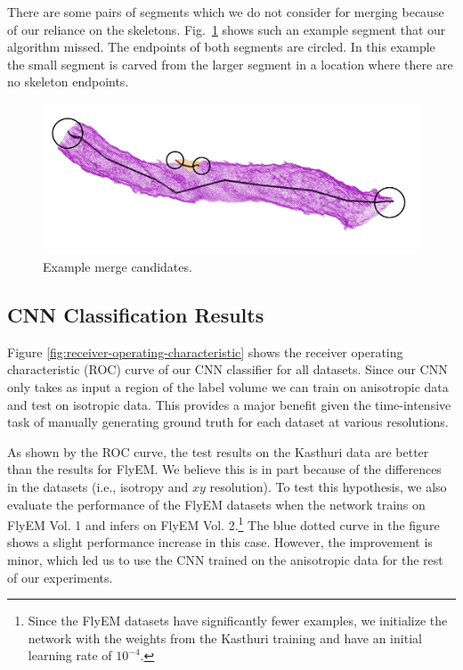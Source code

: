 There are some pairs of segments which we do not consider for merging because of our reliance on the skeletons. 
Fig.~\ref{fig:skeleton-results} shows such an example segment that our algorithm missed. 
The endpoints of both segments are circled.
In this example the small segment is carved from the larger segment in a location where there are no skeleton endpoints.

\begin{figure}[h!]
	\centering
	\includegraphics[width=0.85\linewidth]{./figures/merge_candidate1.png}
	\caption{Example merge candidates.}
	\label{fig:skeleton-results}
\end{figure}


\subsection{CNN Classification Results}

Figure \ref{fig:receiver-operating-characteristic} shows the receiver operating characteristic (ROC) curve of our CNN classifier for all datasets.
Since our CNN only takes as input a region of the label volume we can train on  anisotropic data and test on isotropic data.
This provides a major benefit given the time-intensive task of manually generating ground truth for each dataset at various resolutions.

As shown by the ROC curve, the test results on the Kasthuri data are better than the results for FlyEM.
We believe this is in part because of the differences in the datasets (i.e., isotropy and $xy$ resolution).
To test this hypothesis, we also evaluate the performance of the FlyEM datasets when the network trains on FlyEM Vol. 1 and infers on FlyEM Vol. 2.\footnote{Since the FlyEM datasets have significantly fewer examples, we initialize the network with the weights from the Kasthuri training and have an initial learning rate of $10^{-4}$.}
The blue dotted curve in the figure shows a slight performance increase in this case. However, the improvement is minor, which led us to use the CNN trained on the anisotropic data for the rest of our experiments.

